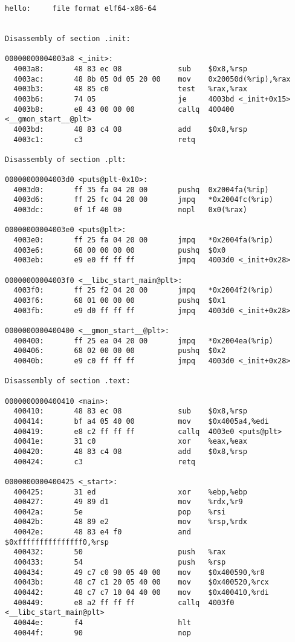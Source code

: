 \begin{verbatim}
hello:     file format elf64-x86-64


Disassembly of section .init:

00000000004003a8 <_init>:
  4003a8:       48 83 ec 08             sub    $0x8,%rsp
  4003ac:       48 8b 05 0d 05 20 00    mov    0x20050d(%rip),%rax
  4003b3:       48 85 c0                test   %rax,%rax
  4003b6:       74 05                   je     4003bd <_init+0x15>
  4003b8:       e8 43 00 00 00          callq  400400 <__gmon_start__@plt>
  4003bd:       48 83 c4 08             add    $0x8,%rsp
  4003c1:       c3                      retq   

Disassembly of section .plt:

00000000004003d0 <puts@plt-0x10>:
  4003d0:       ff 35 fa 04 20 00       pushq  0x2004fa(%rip)
  4003d6:       ff 25 fc 04 20 00       jmpq   *0x2004fc(%rip)
  4003dc:       0f 1f 40 00             nopl   0x0(%rax)

00000000004003e0 <puts@plt>:
  4003e0:       ff 25 fa 04 20 00       jmpq   *0x2004fa(%rip)
  4003e6:       68 00 00 00 00          pushq  $0x0
  4003eb:       e9 e0 ff ff ff          jmpq   4003d0 <_init+0x28>

00000000004003f0 <__libc_start_main@plt>:
  4003f0:       ff 25 f2 04 20 00       jmpq   *0x2004f2(%rip)
  4003f6:       68 01 00 00 00          pushq  $0x1
  4003fb:       e9 d0 ff ff ff          jmpq   4003d0 <_init+0x28>

0000000000400400 <__gmon_start__@plt>:
  400400:       ff 25 ea 04 20 00       jmpq   *0x2004ea(%rip)
  400406:       68 02 00 00 00          pushq  $0x2
  40040b:       e9 c0 ff ff ff          jmpq   4003d0 <_init+0x28>

Disassembly of section .text:

0000000000400410 <main>:
  400410:       48 83 ec 08             sub    $0x8,%rsp
  400414:       bf a4 05 40 00          mov    $0x4005a4,%edi
  400419:       e8 c2 ff ff ff          callq  4003e0 <puts@plt>
  40041e:       31 c0                   xor    %eax,%eax
  400420:       48 83 c4 08             add    $0x8,%rsp
  400424:       c3                      retq   

0000000000400425 <_start>:
  400425:       31 ed                   xor    %ebp,%ebp
  400427:       49 89 d1                mov    %rdx,%r9
  40042a:       5e                      pop    %rsi
  40042b:       48 89 e2                mov    %rsp,%rdx
  40042e:       48 83 e4 f0             and    $0xfffffffffffffff0,%rsp
  400432:       50                      push   %rax
  400433:       54                      push   %rsp
  400434:       49 c7 c0 90 05 40 00    mov    $0x400590,%r8
  40043b:       48 c7 c1 20 05 40 00    mov    $0x400520,%rcx
  400442:       48 c7 c7 10 04 40 00    mov    $0x400410,%rdi
  400449:       e8 a2 ff ff ff          callq  4003f0 <__libc_start_main@plt>
  40044e:       f4                      hlt    
  40044f:       90                      nop
\end{verbatim}

